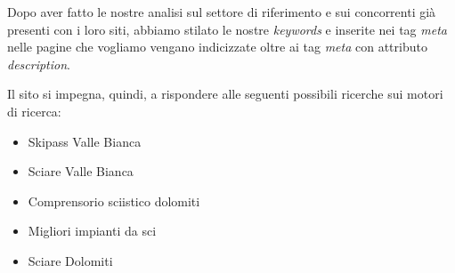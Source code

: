 Dopo aver fatto le nostre analisi sul settore di riferimento e sui concorrenti già presenti con i loro siti, abbiamo stilato le nostre \textit{keywords} e inserite
nei tag \textit{meta} nelle pagine che vogliamo vengano indicizzate oltre ai tag \textit{meta} con attributo \textit{description}. 

Il sito si impegna, quindi, a rispondere alle seguenti possibili ricerche sui motori di ricerca:
\begin{itemize}
    \item Skipass Valle Bianca
    \item Sciare Valle Bianca
    \item Comprensorio sciistico dolomiti
    \item Migliori impianti da sci
    \item Sciare Dolomiti
\end{itemize}
